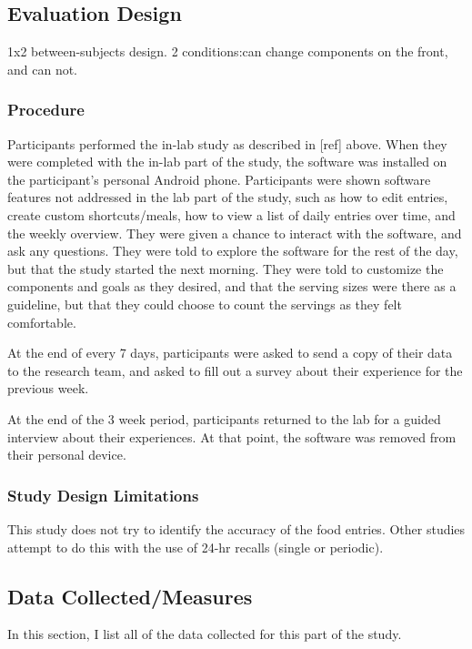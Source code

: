 \subsection{Evaluation Design}
1x2 between-subjects design. 2 conditions:can change components on the front, and can not. 

\subsubsection{Procedure}
Participants performed the in-lab study as described in [ref] above. When they were completed with the in-lab part of the study, the software was installed on the participant's personal Android phone. Participants were shown software features not addressed in the lab part of the study, such as how to edit entries, create custom shortcuts/meals, how to view a list of daily entries over time, and the weekly overview. They were given a chance to interact with the software, and ask any questions. They were told to explore the software for the rest of the day, but that the study started the next morning. They were told to customize the components and goals as they desired, and that the serving sizes were there as a guideline, but that they could choose to count the servings as they felt comfortable. 

At the end of every 7 days, participants were asked to send a copy of their data to the research team, and asked to fill out a survey about their experience for the previous week. 

At the end of the 3 week period, participants returned to the lab for a guided interview about their experiences. At that point, the software was removed from their personal device. 

\subsubsection{Study Design Limitations}

This study does not try to identify the accuracy of the food entries. Other studies attempt to do this with the use of 24-hr recalls (single or periodic). 

\subsection{Data Collected/Measures}
In this section, I list all of the data collected for this part of the study. 

